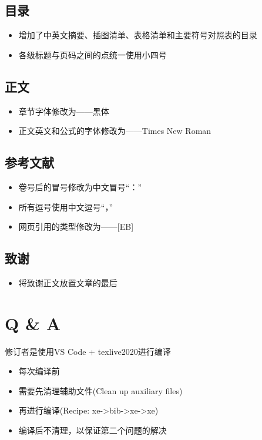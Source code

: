 \subsection{目录}
\begin{itemize}
    \item 增加了中英文摘要、插图清单、表格清单和主要符号对照表的目录
    \item 各级标题与页码之间的点统一使用小四号
\end{itemize}
\subsection{正文}
\begin{itemize}
    \item 章节字体修改为——黑体
    \item 正文英文和公式的字体修改为——Times New Roman
\end{itemize}
\subsection{参考文献}
\begin{itemize}
    \item 卷号后的冒号修改为中文冒号“：”
    \item 所有逗号使用中文逗号“，”
    \item 网页引用的类型修改为——[EB]
\end{itemize}
\subsection{致谢}
\begin{itemize}
    \item 将致谢正文放置文章的最后
\end{itemize}

\section{Q \& A}


修订者是使用{\color{blue}VS Code} + {\color{blue}texlive2020}进行编译
\begin{itemize}
    \item 每次编译前
    \item 需要先清理辅助文件(Clean up auxiliary files)
    \item 再进行编译(Recipe: xe->bib->xe->xe)
    \item 编译后不清理，以保证第二个问题的解决
\end{itemize}

